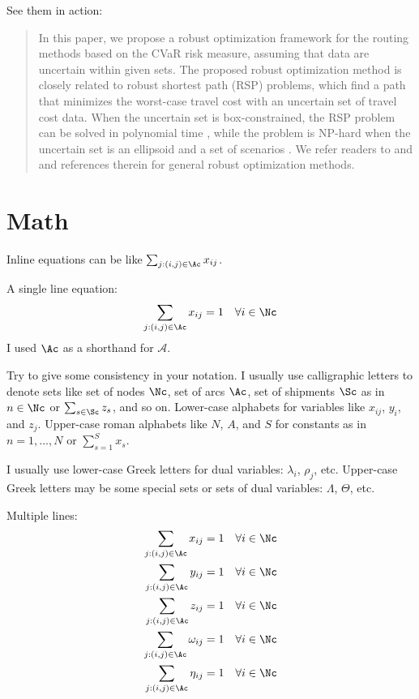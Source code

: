 \documentclass[letterpaper, 11pt]{article}
\begin{document}
See them in action:
\begin{quote}
In this paper, we propose a robust optimization framework for the routing methods based on the CVaR risk measure, assuming that data are uncertain within given sets. The proposed robust optimization method is closely related to robust shortest path (RSP) problems, which find a path that minimizes the worst-case travel cost with an uncertain set of travel cost data. When the uncertain set is box-constrained, the RSP problem can be solved in polynomial time \citep{Bertsimas2003network}, while the problem is NP-hard when the uncertain set is an ellipsoid \citep{Bertsimas2004,Chaerani2005} and a set of scenarios \citep{Kouvelis1996}. We refer readers to \citet{ben2009robust} and \citet{gabrel2012recent} and references therein for general robust optimization methods. 
\end{quote}




\section{Math} \label{sec:math}
Inline equations can be like $\sum_{j:(i,j)\in\Ac} x_{ij}$.

A single line equation:
\begin{equation}
	\sum_{j:(i,j)\in\Ac} x_{ij} = 1 \quad \forall i\in\Nc \label{node_constraint1}
\end{equation}
I used $\Ac$ as a shorthand for $\mathcal{A}$. 

Try to give some consistency in your notation. I usually use calligraphic letters to denote sets like set of nodes $\Nc$, set of arcs $\Ac$, set of shipments $\Sc$ as in $n\in\Nc$ or $\sum_{s\in\Sc} z_s$, and so on. Lower-case alphabets for variables like $x_{ij}$, $y_i$, and $z_j$. Upper-case roman alphabets like $N$, $A$, and $S$ for constants as in $n=1,...,N$ or $\sum_{s=1}^S x_s$. 

I usually use lower-case Greek letters for dual variables: $\lambda_i$, $\rho_j$, etc. Upper-case Greek letters may be some special sets or sets of dual variables: $\Lambda$, $\Theta$, etc.

Multiple lines:
\begin{align}
	\sum_{j:(i,j)\in\Ac} x_{ij} = 1 \quad & \forall i\in\Nc \label{node_constraint2} \\
	\sum_{j:(i,j)\in\Ac} y_{ij} = 1 \quad & \forall i\in\Nc \nonumber \\
	\sum_{j:(i,j)\in\Ac} z_{ij} = 1 \quad & \forall i\in\Nc \label{node_constraint3} \\
	\sum_{j:(i,j)\in\Ac} \omega_{ij} = 1 \quad & \forall i\in\Nc \label{node_constraint4} \\
	\sum_{j:(i,j)\in\Ac} \eta_{ij} = 1 \quad & \forall i\in\Nc \label{node_constraint5} 
\end{align}
\end{document}

